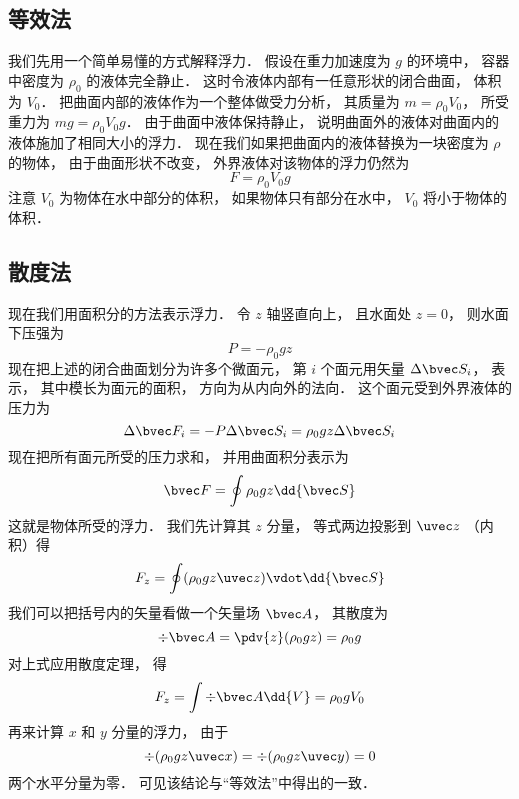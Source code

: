 
\subsection{等效法}

我们先用一个简单易懂的方式解释浮力． 假设在重力加速度为 $g$ 的环境中， 容器中密度为 $\rho_0$ 的液体完全静止． 这时令液体内部有一任意形状的闭合曲面， 体积为 $V_0$． 把曲面内部的液体作为一个整体做受力分析， 其质量为 $m = \rho_0 V_0$， 所受重力为 $mg = \rho_0 V_0 g$． 由于曲面中液体保持静止， 说明曲面外的液体对曲面内的液体施加了相同大小的浮力． 现在我们如果把曲面内的液体替换为一块密度为 $\rho$ 的物体， 由于曲面形状不改变， 外界液体对该物体的浮力仍然为
\begin{equation}
F = \rho_0 V_0 g
\end{equation}
注意 $V_0$ 为物体在水中部分的体积， 如果物体只有部分在水中， $V_0$ 将小于物体的体积．

\subsection{散度法}

现在我们用面积分的方法表示浮力． 令 $z$ 轴竖直向上， 且水面处 $z = 0$， 则水面下压强为
\begin{equation}
P = -\rho_0 g z
\end{equation}
现在把上述的闭合曲面划分为许多个微面元， 第 $i$ 个面元用矢量 $\Delta \bvec S_i$， 表示， 其中模长为面元的面积， 方向为从内向外的法向． 这个面元受到外界液体的压力为
\begin{equation}
\Delta \bvec F_i = -P\Delta \bvec S_i = \rho_0 g z \Delta \bvec S_i
\end{equation}
现在把所有面元所受的压力求和， 并用曲面积分表示为
\begin{equation}
\bvec F = \oint \rho_0 g z \dd{\bvec S}
\end{equation}
这就是物体所受的浮力． 我们先计算其 $z$ 分量， 等式两边投影到 $\uvec z$ （内积）得
\begin{equation}
F_z = \oint (\rho_0 g z \uvec z)\vdot \dd{\bvec S}
\end{equation}
我们可以把括号内的矢量看做一个矢量场 $\bvec A$， 其散度为
\begin{equation}
\div \bvec A = \pdv{z}(\rho_0 g z) = \rho_0 g
\end{equation}
对上式应用散度定理， 得
\begin{equation}
F_z = \int \div\bvec A \dd{V} = \rho_0 g V_0
\end{equation}
再来计算 $x$ 和 $y$ 分量的浮力， 由于
\begin{equation}
\div (\rho_0 g z\uvec x) = \div (\rho_0 g z\uvec y) = 0
\end{equation}
两个水平分量为零． 可见该结论与“等效法”中得出的一致．


